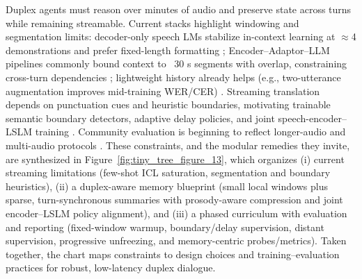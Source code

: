 \documentclass{article}
\begin{document}
Duplex agents must reason over minutes of audio and preserve state across turns while remaining streamable. Current stacks highlight windowing and segmentation limits: decoder-only speech LMs stabilize in-context learning at $\approx$4 demonstrations and prefer fixed-length formatting \cite{hsu2024exploringcontextlearningtextlessspeechla}; Encoder--Adaptor--LLM pipelines commonly bound context to ~30 s segments with overlap, constraining cross-turn dependencies \cite{nguyen2025qwenvsgemmaintegrationwhispercomparative}; lightweight history already helps (e.g., two-utterance augmentation improves mid-training WER/CER) \cite{li2025seewossubmissionmlcslmlessonslearnedspee}. Streaming translation depends on punctuation cues and heuristic boundaries, motivating trainable semantic boundary detectors, adaptive delay policies, and joint speech-encoder--LSLM training \cite{guo2025streamuniachievingstreamingspeechtransla}. Community evaluation is beginning to reflect longer-audio and multi-audio protocols \cite{huang2025dynamicsuperbphase2collaborativelyexpand}. These constraints, and the modular remedies they invite, are synthesized in Figure~\ref{fig:tiny_tree_figure_13}, which organizes (i) current streaming limitations (few-shot ICL saturation, segmentation and boundary heuristics), (ii) a duplex-aware memory blueprint (small local windows plus sparse, turn-synchronous summaries with prosody-aware compression and joint encoder--LSLM policy alignment), and (iii) a phased curriculum with evaluation and reporting (fixed-window warmup, boundary/delay supervision, distant supervision, progressive unfreezing, and memory-centric probes/metrics). Taken together, the chart maps constraints to design choices and training--evaluation practices for robust, low-latency duplex dialogue.
\end{document}
